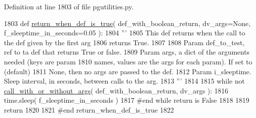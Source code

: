 Definition at line 1803 of file pgutilities.\+py.


\begin{DoxyCode}
1803 \textcolor{keyword}{def }\hyperlink{namespacenegui_1_1pgutilities_a741453431df5aa517c9e2237ad2e6f27}{return\_when\_def\_is\_true}( def\_with\_boolean\_return, dv\_args=None, 
      f\_sleeptime\_in\_seconds=0.05 ):
1804     \textcolor{stringliteral}{'''}
1805 \textcolor{stringliteral}{    This def returns when the call to the def given by the first arg}
1806 \textcolor{stringliteral}{    returns True.}
1807 \textcolor{stringliteral}{}
1808 \textcolor{stringliteral}{    Param def\_to\_test, ref to ta def that returns True or false.}
1809 \textcolor{stringliteral}{    Param args, a dict of the arguments needed (keys are param}
1810 \textcolor{stringliteral}{        names, values are the args for each param).  If set to (default)}
1811 \textcolor{stringliteral}{        None, then no args are passed to the def.}
1812 \textcolor{stringliteral}{    Param i\_sleeptime.  Sleep interval, in seconds, between calls to the arg.}
1813 \textcolor{stringliteral}{    '''}
1814 
1815     \textcolor{keywordflow}{while} \textcolor{keywordflow}{not} \hyperlink{namespacenegui_1_1pgutilities_a1971ec40e5be1289e22cf28e5da882f9}{call\_with\_or\_without\_args}( def\_with\_boolean\_return, dv\_args ):   
1816         time.sleep( f\_sleeptime\_in\_seconds )
1817     \textcolor{comment}{#end while return is False}
1818 
1819     \textcolor{keywordflow}{return}
1820 
1821 \textcolor{comment}{#end return\_when\_def\_is\_true}
1822 
\end{DoxyCode}
